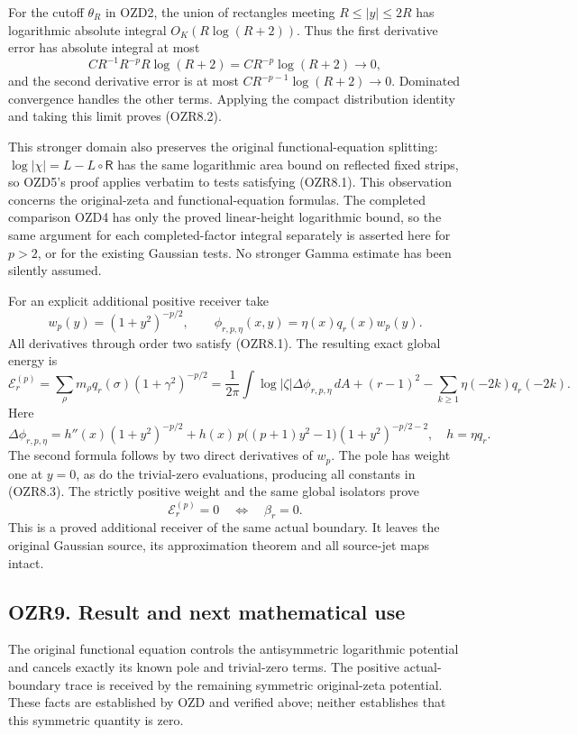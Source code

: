 For the cutoff \(\theta_R\) in OZD2, the union of rectangles meeting
\(R\le|y|\le2R\) has logarithmic absolute integral \(O_K(R\log(R+2))\).
Thus the first derivative error has absolute integral at most \[
C R^{-1}R^{-p}R\log(R+2)=C R^{-p}\log(R+2)\longrightarrow0,
\] and the second derivative error is at most
\(C R^{-p-1}\log(R+2)\to0\). Dominated convergence handles the other
terms. Applying the compact distribution identity and taking this limit
proves (OZR8.2).

This stronger domain also preserves the original functional-equation
splitting: \(\log|\chi|=L-L\circ\mathsf R\) has the same logarithmic
area bound on reflected fixed strips, so OZD5's proof applies verbatim
to tests satisfying (OZR8.1). This observation concerns the
original-zeta and functional-equation formulas. The completed comparison
OZD4 has only the proved linear-height logarithmic bound, so the same
argument for each completed-factor integral separately is asserted here
for \(p>2\), or for the existing Gaussian tests. No stronger Gamma
estimate has been silently assumed.

For an explicit additional positive receiver take \[
w_p(y)=(1+y^2)^{-p/2},\qquad
\phi_{r,p,\eta}(x,y)=\eta(x)q_r(x)w_p(y).
\] All derivatives through order two satisfy (OZR8.1). The resulting
exact global energy is \[
\mathcal E^{(p)}_r=\sum_\rho m_\rho q_r(\sigma)(1+\gamma^2)^{-p/2}
=\frac1{2\pi}\int\log|\zeta|\Delta\phi_{r,p,\eta}\,dA
+(r-1)^2-\sum_{k\ge1}\eta(-2k)q_r(-2k).
\tag{OZR8.3}
\] Here \[
\Delta\phi_{r,p,\eta}=h''(x)(1+y^2)^{-p/2}
+h(x)\,p\bigl((p+1)y^2-1\bigr)(1+y^2)^{-p/2-2},
\quad h=\eta q_r.
\tag{OZR8.4}
\] The second formula follows by two direct derivatives of \(w_p\). The
pole has weight one at \(y=0\), as do the trivial-zero evaluations,
producing all constants in (OZR8.3). The strictly positive weight and
the same global isolators prove \[
\mathcal E^{(p)}_r=0\quad\Longleftrightarrow\quad\beta_r=0.
\tag{OZR8.5}
\] This is a proved additional receiver of the same actual boundary. It
leaves the original Gaussian source, its approximation theorem and all
source-jet maps intact.

\subsection{OZR9. Result and next mathematical
use}\label{ozr9.-result-and-next-mathematical-use}

The original functional equation controls the antisymmetric logarithmic
potential and cancels exactly its known pole and trivial-zero terms. The
positive actual-boundary trace is received by the remaining symmetric
original-zeta potential. These facts are established by OZD and verified
above; neither establishes that this symmetric quantity is zero.

